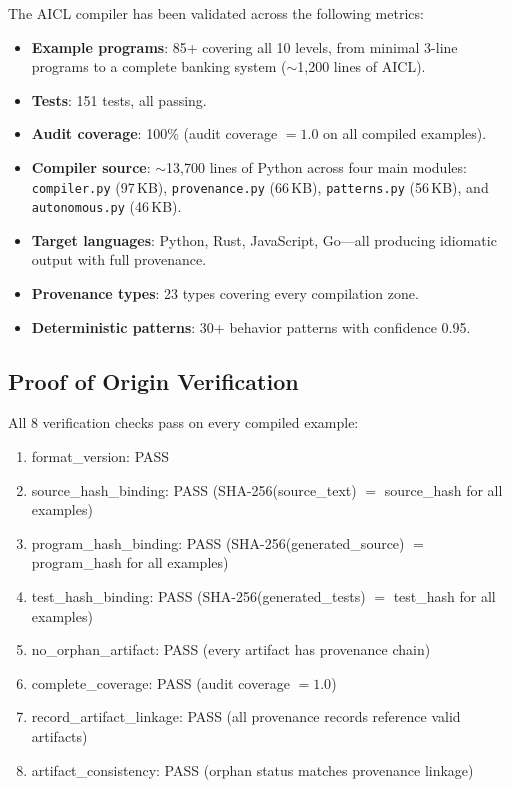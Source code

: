 \documentclass[11pt]{article}
\newcommand{\aicl}{\textsc{AICL}}
\begin{document}
The \aicl{} compiler has been validated across the following metrics:
\begin{itemize}[leftmargin=*,itemsep=2pt]
  \item \textbf{Example programs}: 85+ covering all 10 levels, from minimal 3-line programs to a complete banking system ($\sim$1{,}200 lines of \aicl{}).
  \item \textbf{Tests}: 151 tests, all passing.
  \item \textbf{Audit coverage}: 100\% (audit coverage $= 1.0$ on all compiled examples).
  \item \textbf{Compiler source}: $\sim$13{,}700 lines of Python across four main modules: \texttt{compiler.py} (97\,KB), \texttt{provenance.py} (66\,KB), \texttt{patterns.py} (56\,KB), and \texttt{autonomous.py} (46\,KB).
  \item \textbf{Target languages}: Python, Rust, JavaScript, Go---all producing idiomatic output with full provenance.
  \item \textbf{Provenance types}: 23 types covering every compilation zone.
  \item \textbf{Deterministic patterns}: 30+ behavior patterns with confidence 0.95.
\end{itemize}

\subsection{Proof of Origin Verification}
\label{sec:experiments:proof}

All 8 verification checks pass on every compiled example:
\begin{enumerate}[leftmargin=*,itemsep=1pt]
  \item format\_version: PASS
  \item source\_hash\_binding: PASS (SHA-256(source\_text) $=$ source\_hash for all examples)
  \item program\_hash\_binding: PASS (SHA-256(generated\_source) $=$ program\_hash for all examples)
  \item test\_hash\_binding: PASS (SHA-256(generated\_tests) $=$ test\_hash for all examples)
  \item no\_orphan\_artifact: PASS (every artifact has provenance chain)
  \item complete\_coverage: PASS (audit coverage $= 1.0$)
  \item record\_artifact\_linkage: PASS (all provenance records reference valid artifacts)
  \item artifact\_consistency: PASS (orphan status matches provenance linkage)
\end{enumerate}
\end{document}
